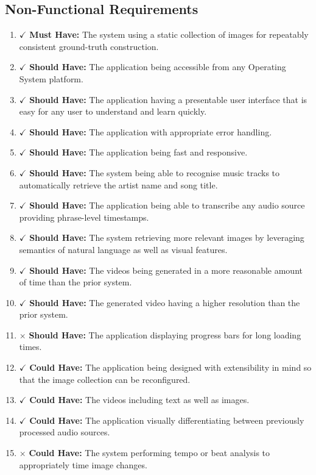 \documentclass{l4proj}
\begin{document}
\subsection{Non-Functional Requirements}
\begin{enumerate}[resume]
    \item {\color{forestgreen} $\checkmark$ \textbf{Must Have:} The system using a static collection of images for repeatably consistent ground-truth construction.}
    \item {\color{forestgreen} $\checkmark$ \textbf{Should Have:} The application being accessible from any Operating System platform.}
    \item {\color{forestgreen} $\checkmark$ \textbf{Should Have:} The application having a presentable user interface that is easy for any user to understand and learn quickly.}
    \item {\color{forestgreen} $\checkmark$ \textbf{Should Have:} The application with appropriate error handling.}
    \item {\color{forestgreen} $\checkmark$ \textbf{Should Have:} The application being fast and responsive.}
    \item {\color{forestgreen} $\checkmark$ \textbf{Should Have:} The system being able to recognise music tracks to automatically retrieve the artist name and song title.}
    \item {\color{forestgreen} $\checkmark$ \textbf{Should Have:} The application being able to transcribe any audio source providing phrase-level timestamps.}
    \item {\color{forestgreen} $\checkmark$ \textbf{Should Have:} The system retrieving more relevant images by leveraging semantics of natural language as well as visual features.}
    \item {\color{forestgreen} $\checkmark$ \textbf{Should Have:} The videos being generated in a more reasonable amount of time than the prior system.}
    \item {\color{forestgreen} $\checkmark$ \textbf{Should Have:} The generated video having a higher resolution than the prior system.}
    \item \label{reqs:28} {\color{brickred} $\times$  \textbf{Should Have:} The application displaying progress bars for long loading times.}
    \item {\color{forestgreen} $\checkmark$ \textbf{Could Have:} The application being designed with extensibility in mind so that the image collection can be reconfigured.}
    \item {\color{forestgreen} $\checkmark$ \textbf{Could Have:} The videos including text as well as images.}
    \item {\color{forestgreen} $\checkmark$ \textbf{Could Have:} The application visually differentiating between previously processed audio sources.}
    \item \label{reqs:32} {\color{brickred} $\times$  \textbf{Could Have:} The system performing tempo or beat analysis to appropriately time image changes.}
\end{enumerate}
\end{document}
